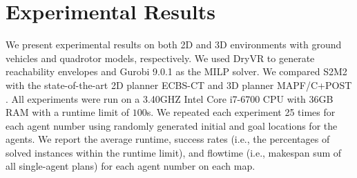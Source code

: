 \documentclass[letterpaper]{article} %
\theoremstyle{definition}
\begin{document}


\section{Experimental Results}\label{section:results}

We present experimental results on both 2D and 3D environments with ground vehicles and quadrotor models, respectively.  We used DryVR \cite{fan2017d} to generate reachability envelopes and Gurobi 9.0.1 \cite{gurobi2020gurobi} as the MILP solver. We compared S2M2 with the state-of-the-art 2D planner ECBS-CT \cite{cohen2019optimal} and 3D planner MAPF/C+POST \cite{honig2018trajectory}. All experiments were run on a 3.40GHZ Intel Core i7-6700 CPU with 36GB RAM with a runtime limit of $100$s. We repeated each experiment 25 times for each agent number using randomly generated initial and goal locations for the agents. We report the average runtime, success rates (i.e., the percentages of solved instances within the runtime limit), and flowtime (i.e., makespan sum of all single-agent plans) for each agent number on each map. 
\end{document}
